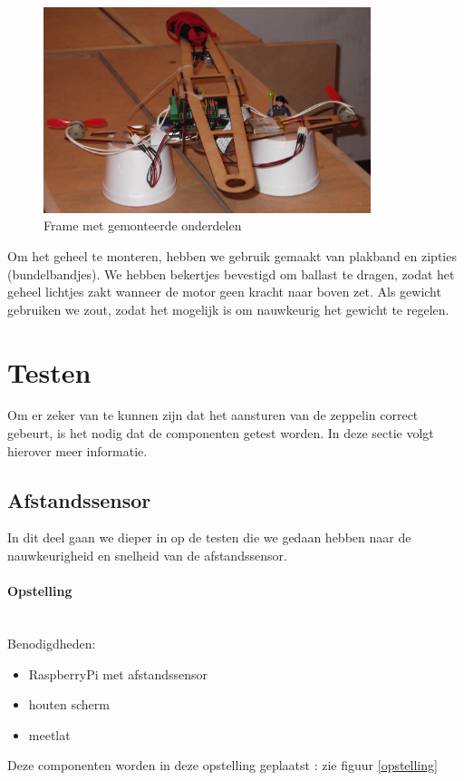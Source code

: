 \documentclass[eind]{penoverslag}
\begin{document}
\begin{figure}[ht!]
\centering
\includegraphics[height=60mm]{zeppelinFrame.jpg}
\caption{Frame met gemonteerde onderdelen}
\label{zeppFrame}
\end{figure}

Om het geheel te monteren, hebben we gebruik gemaakt van plakband en zipties (bundelbandjes). We hebben bekertjes bevestigd om ballast te dragen, zodat het geheel lichtjes zakt wanneer de motor geen kracht naar boven zet. Als gewicht gebruiken we zout, zodat het mogelijk is om nauwkeurig het gewicht te regelen. \\

\section{Testen}

Om er zeker van te kunnen zijn dat het aansturen van de zeppelin correct gebeurt, is het nodig dat de componenten getest worden. In deze sectie volgt hierover meer informatie. 
\subsection{Afstandssensor}

In dit deel gaan we dieper in op de testen die we gedaan hebben naar de nauwkeurigheid en snelheid van de afstandssensor.

\paragraph{Opstelling} ~\\
Benodigdheden:
\begin{itemize}
	\item RaspberryPi met afstandssensor
	\item houten scherm
	\item meetlat
\end{itemize}
Deze componenten worden in deze opstelling geplaatst : zie figuur \ref{opstelling}
\end{document}

